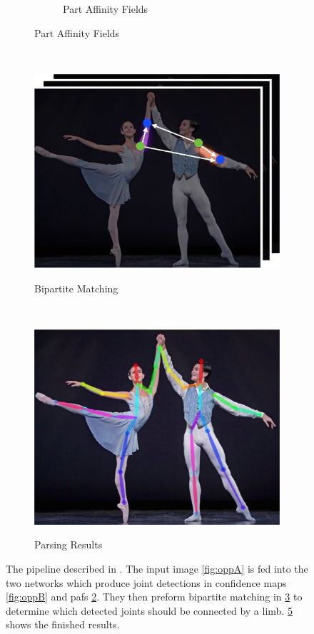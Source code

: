 \begin{figure}[t!]
\begin{subfigure}[t]{0.24\textwidth}
\begin{subfigure}[b]{1\textwidth}
      \label{fig:oppC}
      \caption{Part Affinity Fields}
    \end{subfigure}    
  \end{subfigure}%
  ~
  \begin{subfigure}[t]{0.24\textwidth}
    \includegraphics[width=1\linewidth]{img/openpose_pipeline_d}
    \label{fig:oppD}
    \caption{Bipartite Matching}
  \end{subfigure}%
  ~
  \begin{subfigure}[t]{0.24\textwidth}
    \includegraphics[width=1\linewidth]{img/openpose_pipeline_e}
    \label{fig:oppE}
    \caption{Parsing Results}
  \end{subfigure}
  \caption{The pipeline described in \cite{cao2017realtime}. The input image \ref{fig:oppA} is fed into the two networks which produce joint detections in confidence maps \ref{fig:oppB} and \gls{paf}s \ref{fig:oppC}. They then preform bipartite matching in \ref{fig:oppD} to determine which detected joints should be connected by a limb. \ref{fig:oppE} shows the finished results.}
\end{figure}

